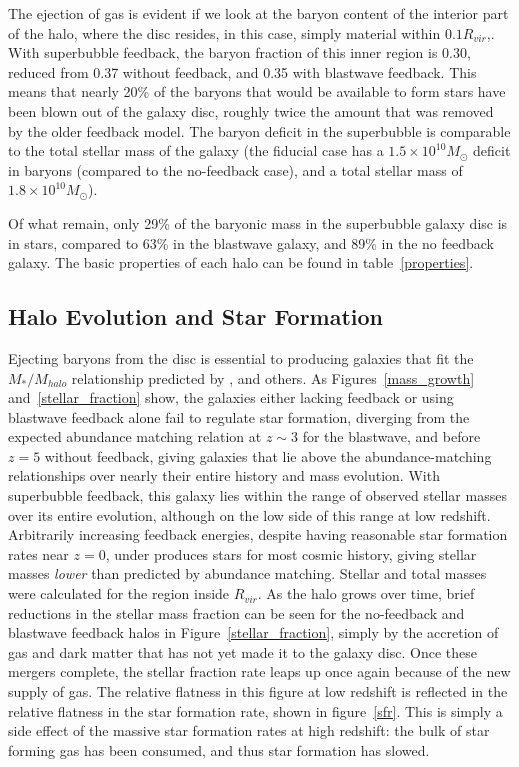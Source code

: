 The ejection of gas is evident if we look at the baryon content of the interior
part of the halo, where the disc resides, in this case, simply material within
$0.1R_{vir}$,.  With superbubble feedback, the baryon fraction of this inner
region is 0.30, reduced from 0.37 without feedback, and 0.35 with blastwave
feedback.  This means that nearly 20\% of the baryons that would be available to
form stars have been blown out of the galaxy disc, roughly twice the amount that
was removed by the older feedback model.  The baryon deficit in the superbubble
is comparable to the total stellar mass of the galaxy (the fiducial case has a
$1.5\times 10^{10}M_\odot$ deficit in baryons (compared to the no-feedback
case), and a total stellar mass of $1.8\times 10^{10}M_\odot$).  

Of what remain, only 29\% of the baryonic mass in the superbubble galaxy disc is
in stars, compared to 63\% in the blastwave galaxy, and 89\% in the no
feedback galaxy.  The basic properties of each halo can be found in
table~\ref{properties}.

\subsection{Halo Evolution and Star Formation}
Ejecting baryons from the disc is essential to producing galaxies that fit the
$M_*/M_{halo}$ relationship predicted by \citet{Behroozi2013},
\citet{Moster2013} and others.  As Figures~\ref{mass_growth}
and~\ref{stellar_fraction} show, the galaxies either lacking feedback or using
blastwave feedback alone fail to regulate star formation, diverging from the
expected abundance matching relation at $z\sim3$ for the blastwave, and before
$z=5$ without feedback, giving galaxies that lie above the abundance-matching
relationships over nearly their entire history and mass evolution.  With
superbubble feedback, this galaxy lies within the range of observed stellar
masses over its entire evolution, although on the low side of this range at low
redshift.  Arbitrarily increasing feedback energies, despite having reasonable
star formation rates near $z=0$, under produces stars for most cosmic history,
giving stellar masses {\it lower} than predicted by abundance matching.  Stellar
and total masses were calculated for the region inside $R_{vir}$.  As the halo
grows over time, brief reductions in the stellar mass fraction can be seen for
the no-feedback and blastwave feedback halos in Figure~\ref{stellar_fraction},
simply by the accretion of gas and dark matter that has not yet made it to the
galaxy disc.  Once these mergers complete, the stellar fraction rate leaps up
once again because of the new supply of gas.  The relative flatness in this
figure at low redshift is reflected in the relative flatness in the star
formation rate, shown in figure~\ref{sfr}.  This is simply a side effect of the
massive star formation rates at high redshift:  the bulk of star forming gas has
been consumed, and thus star formation has slowed.


